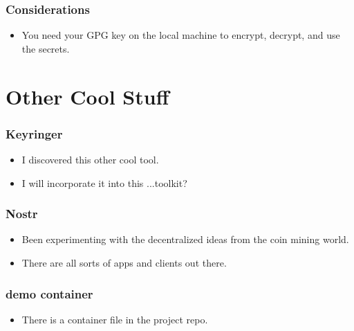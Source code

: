 \documentclass[aspectratio=169]{beamer}
\makeatletter
\def\sectionsubtitle#1{\gdef\@sectionsubtitle{#1}}
\gdef\@sectionsubtitle{}
\makeatother
\begin{document}
\begin{frame}
	\frametitle{Considerations}
	\begin{itemize}
		\item You need your GPG key on the local machine to encrypt, decrypt, and use the secrets.
	\end{itemize}
\end{frame}

\sectionsubtitle{Where is all this going?}
\section{Other Cool Stuff}

\begin{frame}
    \frametitle{Keyringer}
    \begin{itemize}
        \item I discovered this other cool tool.
        \item I will incorporate it into this ...toolkit?
    \end{itemize}
\end{frame}

\begin{frame}
    \frametitle{Nostr}
    \begin{itemize}
        \item Been experimenting with the decentralized ideas from the coin mining world.
        \item There are all sorts of apps and clients out there.
    \end{itemize}
\end{frame}

\begin{frame}
    \frametitle{demo container}
    \begin{itemize}
        \item There is a container file in the project repo.
    \end{itemize}
\end{frame}
\end{document}
